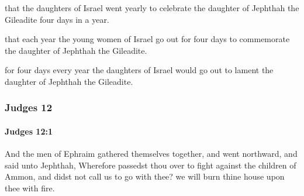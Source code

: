 			\begin{versebox}
					\item[BHS] 
					\item[ASV] that the daughters of Israel went yearly to celebrate the daughter of Jephthah the Gileadite four days in a year.
					\item[NIV] that each year the young women of Israel go out for four days to commemorate the daughter of Jephthah the Gileadite.
					\item[NRSV] for four days every year the daughters of Israel would go out to lament the daughter of Jephthah the Gileadite.
			\end{versebox}
	\subsubsection{Judges 12} %
		\label{JUDGES-12}

		\paragraph{Judges 12:1} %
			\label{JUDGES-12-1}

			And the men of Ephraim gathered themselves together, and went northward, and said unto Jephthah, Wherefore passedst thou over to fight against the children of Ammon, and didst not call us to go with thee? we will burn thine house upon thee with fire.

